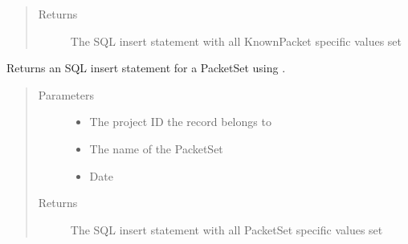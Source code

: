 \documentclass[letterpaper,10pt,english]{sphinxmanual}
\begin{document}
\begin{fulllineitems}
\begin{fulllineitems}
\begin{quote}
\begin{description}
\item[{Returns}] \leavevmode
The SQL insert statement with all KnownPacket specific values set

\end{description}\end{quote}

\end{fulllineitems}


\begin{fulllineitems}
\label{\detokenize{src:src.Database.DatabaseStatements.getInsertPacketSetStatement}}
Returns an SQL insert statement for a PacketSet using {\hyperref[\detokenize{src:src.Database.DatabaseStatements.getInsertStatement}]{}}.
\begin{quote}\begin{description}
\item[{Parameters}] \leavevmode\begin{itemize}
\item {} 
 \textendash{} The project ID the record belongs to

\item {} 
 \textendash{} The name of the PacketSet

\item {} 
 \textendash{} Date

\end{itemize}

\item[{Returns}] \leavevmode
The SQL insert statement with all PacketSet specific values set

\end{description}\end{quote}

\end{fulllineitems}



\end{fulllineitems}
\end{document}
